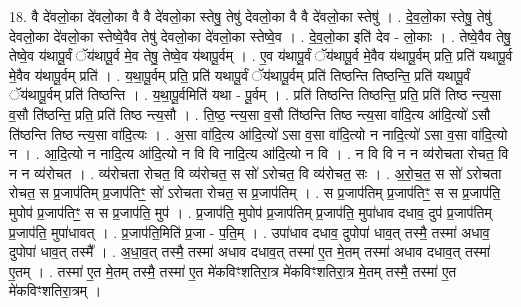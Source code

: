 \documentclass[17pt]{extarticle}
\begin{document}
18. वै दे॑वलो॒का दे॑वलो॒का वै वै दे॑वलो॒का स्तेषु॒ तेषु॑ देवलो॒का वै वै दे॑वलो॒का स्तेषु॑ । . दे॒व॒लो॒का स्तेषु॒ तेषु॑ देवलो॒का दे॑वलो॒का स्तेष्वे॒वैव तेषु॑ देवलो॒का दे॑वलो॒का स्तेष्वे॒व । . दे॒व॒लो॒का इति॑ देव - लो॒काः । . तेष्वे॒वैव तेषु॒ तेष्वे॒व य॑थापू॒र्वं ॅय॑थापू॒र्व मे॒व तेषु॒ तेष्वे॒व य॑थापू॒र्वम् । . ए॒व य॑थापू॒र्वं ॅय॑थापू॒र्व मे॒वैव य॑थापू॒र्वम् प्रति॒ प्रति॑ यथापू॒र्व मे॒वैव य॑थापू॒र्वम् प्रति॑ । . य॒था॒पू॒र्वम् प्रति॒ प्रति॑ यथापू॒र्वं ॅय॑थापू॒र्वम् प्रति॑ तिष्ठन्ति तिष्ठन्ति॒ प्रति॑ यथापू॒र्वं ॅय॑थापू॒र्वम् प्रति॑ तिष्ठन्ति । . य॒था॒पू॒र्वमिति॑ यथा - पू॒र्वम् । . प्रति॑ तिष्ठन्ति तिष्ठन्ति॒ प्रति॒ प्रति॑ तिष्ठ न्त्य॒सा व॒सौ ति॑ष्ठन्ति॒ प्रति॒ प्रति॑ तिष्ठ न्त्य॒सौ । . ति॒ष्ठ॒ न्त्य॒सा व॒सौ ति॑ष्ठन्ति तिष्ठ न्त्य॒सा वा॑दि॒त्य आ॑दि॒त्यो॑ ऽसौ ति॑ष्ठन्ति तिष्ठ न्त्य॒सा वा॑दि॒त्यः । . अ॒सा वा॑दि॒त्य आ॑दि॒त्यो॑ ऽसा व॒सा वा॑दि॒त्यो न नादि॒त्यो॑ ऽसा व॒सा वा॑दि॒त्यो न । . आ॒दि॒त्यो न नादि॒त्य आ॑दि॒त्यो न वि वि नादि॒त्य आ॑दि॒त्यो न वि । . न वि वि न न व्य॑रोचता रोचत॒ वि न न व्य॑रोचत । . व्य॑रोचता रोचत॒ वि व्य॑रोचत॒ स सो॑ ऽरोचत॒ वि व्य॑रोचत॒ सः । . अ॒रो॒च॒त॒ स सो॑ ऽरोचता रोचत॒ स प्र॒जाप॑तिम् प्र॒जाप॑तिꣳ॒॒ सो॑ ऽरोचता रोचत॒ स प्र॒जाप॑तिम् । . स प्र॒जाप॑तिम् प्र॒जाप॑तिꣳ॒॒ स स प्र॒जाप॑ति॒ मुपोप॑ प्र॒जाप॑तिꣳ॒॒ स स प्र॒जाप॑ति॒ मुप॑ । . प्र॒जाप॑ति॒ मुपोप॑ प्र॒जाप॑तिम् प्र॒जाप॑ति॒ मुपा॑धाव दधाव॒ दुप॑ प्र॒जाप॑तिम् प्र॒जाप॑ति॒ मुपा॑धावत् । . प्र॒जाप॑ति॒मिति॑ प्र॒जा - प॒ति॒म् । . उपा॑धाव दधाव॒ दुपोपा॑ धाव॒त् तस्मै॒ तस्मा॑ अधाव॒ दुपोपा॑ धाव॒त् तस्मै᳚ । . अ॒धा॒व॒त् तस्मै॒ तस्मा॑ अधाव दधाव॒त् तस्मा॑ ए॒त मे॒तम् तस्मा॑ अधाव दधाव॒त् तस्मा॑ ए॒तम् । . तस्मा॑ ए॒त मे॒तम् तस्मै॒ तस्मा॑ ए॒त मे॑कविꣳशतिरा॒त्र मे॑कविꣳशतिरा॒त्र मे॒तम् तस्मै॒ तस्मा॑ ए॒त मे॑कविꣳशतिरा॒त्रम् । \newline
\end{document}
